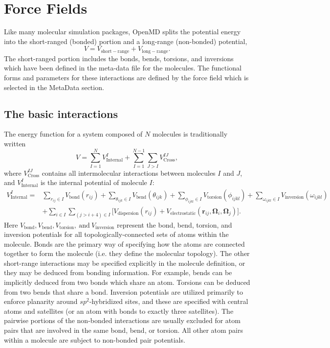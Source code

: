 \documentclass[]{book}
\begin{document}
\chapter{\label{section:forceFields}Force Fields}

Like many molecular simulation packages, {\sc OpenMD} splits the
potential energy into the short-ranged (bonded) portion and a
long-range (non-bonded) potential,
\begin{equation}
V = V_{\mathrm{short-range}} + V_{\mathrm{long-range}}.
\end{equation}
The short-ranged portion includes the bonds, bends, torsions, and
inversions which have been defined in the meta-data file for the
molecules.  The functional forms and parameters for these interactions
are defined by the force field which is selected in the MetaData
section.

\section{\label{section:shortRange}The basic interactions}

The energy function for a system composed of $N$ molecules is
traditionally written
\begin{equation}
V = \sum^{N}_{I=1} V^{I}_{\text{Internal}}
	+ \sum^{N-1}_{I=1} \sum_{J>I} V^{IJ}_{\text{Cross}},
\label{eq:totalPotential}
\end{equation}
where $V^{IJ}_{\text{Cross}}$ contains all intermolecular interactions
between molecules $I$ and $J$, and $V^{I}_{\text{Internal}}$ is the
internal potential of molecule $I$:
\begin{align*}
 V^{I}_{\text{Internal}} =  &
 \sum_{r_{ij} \in I} V_{\text{bond}}(r_{ij})
 + \sum_{\theta_{ijk} \in I} V_{\text{bend}}(\theta_{ijk})
 + \sum_{\phi_{ijkl} \in I} V_{\text{torsion}}(\phi_{ijkl})
 + \sum_{\omega_{ijkl} \in I} V_{\text{inversion}}(\omega_{ijkl}) \\
 & + \sum_{i \in I} \sum_{(j>i+4) \in I} 
 \biggl[ V_{\text{dispersion}}(r_{ij}) +  V_{\text{electrostatic}}
 (\mathbf{r}_{ij},\boldsymbol{\Omega}_{i},\boldsymbol{\Omega}_{j})
 \biggr].
\label{eq:internalPotential}
\end{align*}
Here $V_{\text{bond}}, V_{\text{bend}},
V_{\text{torsion}},\mathrm{~and~} V_{\text{inversion}}$ represent the
bond, bend, torsion, and inversion potentials for all
topologically-connected sets of atoms within the molecule.  Bonds are
the primary way of specifying how the atoms are connected together to
form the molecule (i.e. they define the molecular topology).  The
other short-range interactions may be specified explicitly in the
molecule definition, or they may be deduced from bonding information.
For example, bends can be implicitly deduced from two bonds which
share an atom.  Torsions can be deduced from two bends that share a
bond.  Inversion potentials are utilized primarily to enforce
planarity around $sp^2$-hybridized sites, and these are specified with
central atoms and satellites (or an atom with bonds to exactly three
satellites).  The pairwise portions of the non-bonded interactions are
usually excluded for atom pairs that are involved in the same bond,
bend, or torsion. All other atom pairs within a molecule are subject
to non-bonded pair potentials.
\end{document}
